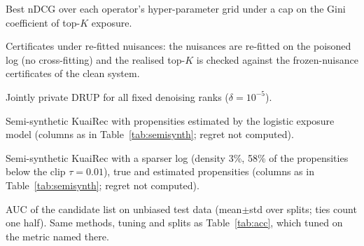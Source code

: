 \begin{table}[h]\centering\small
\caption{Best nDCG over each operator's hyper-parameter grid under a cap on the
Gini coefficient of top-$K$ exposure.}\label{tab:frontier}
\begin{adjustbox}{max width=\textwidth}

\end{adjustbox}
\end{table}

\begin{table}[h]\centering\small
\caption{Certificates under re-fitted nuisances: the nuisances are re-fitted on the
poisoned log (no cross-fitting) and the realised top-$K$ is checked against the
frozen-nuisance certificates of the clean system.}\label{tab:refit}
\begin{adjustbox}{max width=\textwidth}

\end{adjustbox}
\end{table}

\begin{table}[h]\centering\small
\caption{Jointly private DRUP for all fixed denoising ranks ($\delta=10^{-5}$).}\label{tab:privfull}
\begin{adjustbox}{max width=\textwidth}

\end{adjustbox}
\end{table}

\begin{table}[h]\centering\small
\caption{Semi-synthetic KuaiRec with propensities estimated by the logistic
exposure model (columns as in Table~\ref{tab:semisynth}; regret not computed).}\label{tab:semisynthest}
\begin{adjustbox}{max width=\textwidth}

\end{adjustbox}
\end{table}

\begin{table}[h]\centering\small
\caption{Semi-synthetic KuaiRec with a sparser log (density 3\%, 58\% of the
propensities below the clip $\tau=0.01$), true and estimated propensities
(columns as in Table~\ref{tab:semisynth}; regret not computed).}\label{tab:semisynthsparse}
\begin{adjustbox}{max width=\textwidth}

\end{adjustbox}
\end{table}

\begin{table}[p]\centering\scriptsize
\caption{AUC of the candidate list on unbiased test data (mean$\pm$std over splits; ties count one half). Same methods, tuning and splits as Table~\ref{tab:acc}, which tuned on the metric named there.}\label{tab:auc}
\begin{adjustbox}{max width=\textwidth}

\end{adjustbox}
\end{table}

